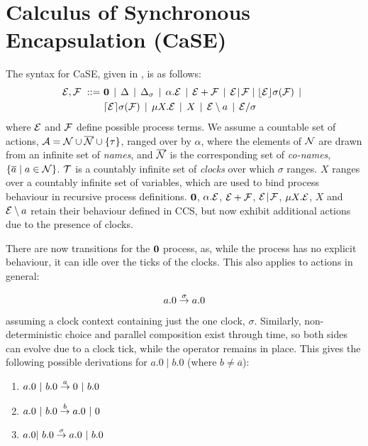 \section{Calculus of Synchronous Encapsulation (CaSE)}
\label{case}

The syntax for CaSE, given in \cite{norton05alg}, is as follows:
\begin{equation}
  \begin{aligned}
    \text{$\mathcal{E}$}, \text{$\mathcal{F}$}\ ::=\ &
    \textbf{0}  \;\,|\,\; 
    \Delta \;\,|\,\; 
    \Delta_{\sigma} \;\,|\,\; 
    \alpha . \text{$\mathcal{E}$}  \;\,|\,\;
    \text{$\mathcal{E}$} + \text{$\mathcal{F}$} \;\,|\,\; 
   \text{$\mathcal{E}$} \mathrel{\!|\!} \text{$\mathcal{F}$} \mid
    \lfloor{\text{$\mathcal{E}$}}\rfloor {\sigma} ({\text{$\mathcal{F}$}}) \;\,|\,\; \\
    & \lceil{\text{$\mathcal{E}$}}\rceil {\sigma} ({\text{$\mathcal{F}$}}) \;\,|\,\; 
    \mu X . \text{$\mathcal{E}$} \;\,|\,\; 
    X \;\,|\,\; 
    \text{$\mathcal{E}$} \setminus a \;\,|\,\; 
    \text{$\mathcal{E}$} / \sigma
  \end{aligned}
\end{equation}
where $\text{$\mathcal{E}$}$ and $\text{$\mathcal{F}$}$ define possible process terms. We assume a
countable set of actions, $\text{$\mathcal{A}$} = \text{$\mathcal{N}$} \cup \text{$\overline{\text{$\mathcal{N}$}}$} \cup
\{\tau\}$, ranged over by $\alpha$, where the elements of $\text{$\mathcal{N}$}$ are
drawn from an infinite set of \emph{names}, and $\text{$\overline{\text{$\mathcal{N}$}}$}$ is the
corresponding set of \emph{co-names}, $\{\overline{a} \mid a \in
\text{$\mathcal{N}$}\}$. $\text{$\mathcal{T}$}$ is a countably infinite set of \emph{clocks} over
which $\sigma$ ranges. $X$ ranges over a countably infinite set of
variables, which are used to bind process behaviour in recursive
process definitions. $\textbf{0}$, $\alpha . \text{$\mathcal{E}$}$, $\text{$\mathcal{E}$} + \text{$\mathcal{F}$}$,
$\text{$\mathcal{E}$} \mathrel{\!|\!} \text{$\mathcal{F}$}$, $\mu X . \text{$\mathcal{E}$}$, $X$ and $\text{$\mathcal{E}$}
\setminus a$ retain their behaviour defined in CCS, but now exhibit
additional actions due to the presence of clocks.

There are now transitions for the $\textbf{0}$ process, as, while the
process has no explicit behaviour, it can idle over the ticks of the
clocks.  This also applies to actions in general:

\begin{equation}
a.0 \stackrel{\sigma}{\rightarrow} a.0
\end{equation}

\noindent assuming a clock context containing just the one clock,
$\sigma$. Similarly, non-deterministic choice and parallel composition
exist through time, so both sides can evolve due to a clock tick,
while the operator remains in place.  This gives the following
possible derivations for $a.0\;|\;b.0$ (where $b \ne \overline{a}$):

\begin{enumerate}
\item $a.0\ |\ b.0 \derives{a} 0\ |\ b.0$
\item $a.0\ |\ b.0 \derives{b} a.0\ |\ 0$
\item $a.0 |\ b.0 \derives{\sigma} a.0\ |\ b.0$
\end{enumerate}

